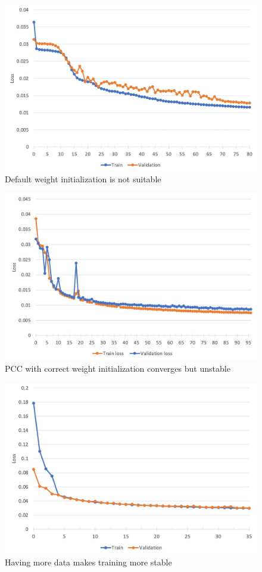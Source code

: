 \begin{figure}[H]
	\begin{center}
		\includegraphics[width=0.5\linewidth]{bilder/nuclei/no-wi.jpg}
		\caption{Default weight initialization is not suitable}\label{fig:no-wi}
	\end{center}
\end{figure}

\begin{figure}[H]
	\begin{center}
		\includegraphics[width=0.5\linewidth]{bilder/nuclei/pca-2-datasets.jpg}
		\caption{PCC with correct weight initialization converges but unstable}\label{fig:pcc-2-dataset}
	\end{center}
\end{figure}

\begin{figure}[H]
	\begin{center}
		\includegraphics[width=0.5\linewidth]{bilder/nuclei/full-dataset.jpg}
		\caption{Having more data makes training more stable}\label{fig:full-dataset-pcc}
	\end{center}
\end{figure}


